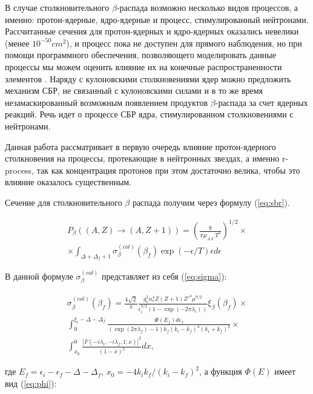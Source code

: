 \documentclass[%
master,    %
natbib,      %
subf,        %
href,        %
colorlinks,  %
]{disser}
\begin{document}
В случае столкновительного $\beta$-распада возможно несколько видов процессов, а именно: протон-ядерные, ядро-ядерные и процесс, стимулированный нейтронами. Рассчитанные сечения для протон-ядерных и ядро-ядерных оказались невелики (менее $10^{-50}cm^2$), и процесс пока не доступен для прямого наблюдения, но при помощи программного обеспечения, позволяющего моделировать данные процессы мы можем оценить влияние их на конечные распространенности элементов \cite{tak_article}. Наряду с кулоновскими столкновениями ядер можно предложить механизм СБР, не связанный с кулоновскими силами и в то же время незамаскированный возможным появлением продуктов $\beta$-распада за счет ядерных реакций. Речь идет о процессе СБР ядра, стимулированном столкновениями с нейтронами.

Данная работа рассматривает в первую очередь влияние протон-ядерного столкновения на процессы, протекающие в нейтронных звездах, а именно r-process, так как концентрация протонов при этом достаточно велика, чтобы это влияние оказалось существенным. 

Сечение для столкновительного $\beta$ распада получим через формулу (\ref{eq:sbr}).

\begin{equation}
\label{eq:sbr}
\begin{split}
P_{\beta}\left((A, Z) \to (A, Z + 1)\right) = \left(\frac{8}{\pi\mu_{A A'} T^3}\right)^{1/2} \times \\
\times \int_{\Delta + \Delta_f + 1}\sigma_\beta^{(col)}(\beta_f)\exp(-\epsilon/T)\epsilon d \epsilon
\end{split}
\end{equation}

В данной формуле $\sigma_\beta^{(col)}$ представляет из себя (\ref{eq:sigma}): 

\begin{equation}
\label{eq:sigma}
\begin{split}
\sigma_\beta^{(col)}(\beta_f) =
\frac{4\sqrt{2}}{\pi}\frac{g_v^2\alpha_e^4 Z (Z + 1)Z'^4\mu^{9/2}}{\epsilon_i^{3/2}(1-\exp(-2\pi\lambda_i))}\xi_\beta(\beta_f) \times \\
\int_{0}^{\xi_i-\Delta-\Delta_f}\frac{\Phi(E_f)d\epsilon_f}{(\exp(2\pi\lambda_f)-1)k_f(k_i-k_f)^4(k_i+k_f)^2} \times \\
\int_{x_0}^{0}\frac{\left|F(-i\lambda_i,-i\lambda_f,1;x)\right|^2}{(1-x)^2}dx,
\end{split}
\end{equation}

где $E_f = \epsilon_i - \epsilon_f - \Delta - \Delta_f$, $x_0 = -4 k_i k_f / (k_i - k_f)^2$, а функция $\Phi(E)$ имеет вид (\ref{eq:phi}):
\end{document}
